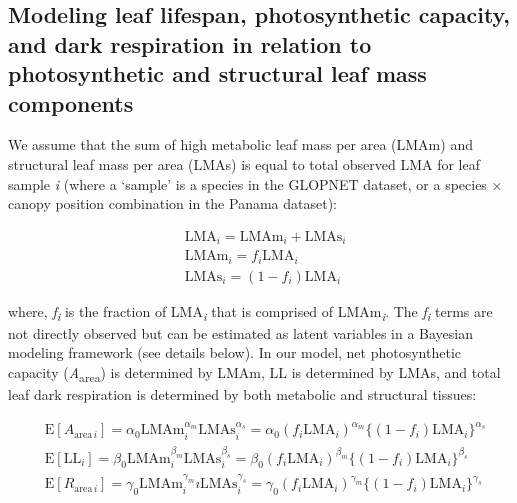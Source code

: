 \documentclass[12pt,]{article}
\theoremstyle{definition}
\theoremstyle{definition}
\theoremstyle{definition}
\theoremstyle{remark}
\begin{document}
\hypertarget{modeling-leaf-lifespan-photosynthetic-capacity-and-dark-respiration-in-relation-to-photosynthetic-and-structural-leaf-mass-components}{%
\subsection{Modeling leaf lifespan, photosynthetic capacity, and dark
respiration in relation to photosynthetic and structural leaf mass
components}\label{modeling-leaf-lifespan-photosynthetic-capacity-and-dark-respiration-in-relation-to-photosynthetic-and-structural-leaf-mass-components}}

We assume that the sum of high metabolic leaf mass per area (LMAm) and
structural leaf mass per area (LMAs) is equal to total observed LMA for
leaf sample \emph{i} (where a `sample' is a species in the GLOPNET
dataset, or a species × canopy position combination in the Panama
dataset):

\begin{align}
  &\mathrm{LMA}_{i} =\mathrm{LMAm}_{i} + \mathrm{LMAs}_{i} \label{eq:LMA}\\
  &\mathrm{LMAm}_{i} = f_{i} \mathrm{LMA}_{i} \label{eq:LMAm}\\
  &\mathrm{LMAs}_{i} = (1 - f_{i})  \mathrm{LMA}_{i}\label{eq:LMAs}
\end{align}

where, \emph{f\textsubscript{i}} is the fraction of
LMA\textsubscript{\emph{i}} that is comprised of
LMAm\textsubscript{\emph{i}}. The \emph{f\textsubscript{i}} terms are
not directly observed but can be estimated as latent variables in a
Bayesian modeling framework (see details below). In our model, net
photosynthetic capacity (\emph{A}\textsubscript{area}) is determined by
LMAm, LL is determined by LMAs, and total leaf dark respiration is
determined by both metabolic and structural tissues:

\begin{align}
& \mathrm{E}[A_{\mathrm{area} \, i}]
= \alpha_0\mathrm{LMAm}_{i}^{\alpha_m}\mathrm{LMAs}_i^{\alpha_s}  =  \alpha_0 (f_i \mathrm{LMA}_{i})^{\alpha_m} \bigl\{(1-f_i) \mathrm{LMA}_{i}\bigr\}^{\alpha_s} \label{eq:E-A} \\
& \mathrm{E}[\mathrm{LL}_i] = \beta_0\mathrm{LMAm}_{i}^{\beta_m} \mathrm{LMAs}_{i}^{\beta_s}   = \beta_0 (f_i \mathrm{LMA}_{i})^{\beta_m} \bigl\{(1-f_i) \mathrm{LMA}_{i}\bigr\}^{\beta_s} \label{eq:E-LL} \\
& \mathrm{E}[R_{\mathrm{area} \, i}]
= \gamma_0\mathrm{LMAm}_{i}^{\gamma_m}ı \mathrm{LMAs}_{i}^{\gamma_s}
= \gamma_0 (f_i \mathrm{LMA}_{i})^{\gamma_m}  \bigl\{(1-f_i)\mathrm{LMA}_{i}\bigr\}^{\gamma_s} \label{eq:E-R}
\end{align}
\end{document}
